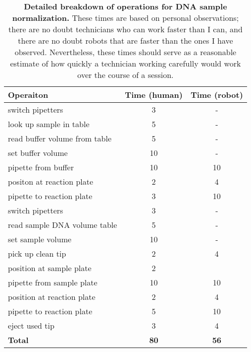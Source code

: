 \begin{table}[]
\centering
\begin{tabular}{lcc}
\toprule
\textbf{Operaiton} & \textbf{Time (human)} & \textbf{Time (robot)} \\ \midrule
switch pipetters & 3 & - \\
look up sample in table & 5 & - \\
read buffer volume from table & 5 & - \\
set buffer volume & 10 & - \\
pipette from buffer & 10 & 10 \\
positon at reaction plate & 2 & 4 \\
pipette to reaction plate & 3 & 10 \\
switch pipetters & 3 & - \\
read sample DNA volume table & 5 & - \\
set sample volume & 10 & - \\
pick up clean tip & 2 & 4 \\
position at sample plate & 2 &  \\
pipette from sample plate & 10 & 10 \\
position at reaction plate & 2 & 4 \\
pipette to reaction plate & 5 & 10 \\
eject used tip & 3 & 4 \\ \midrule
\textbf{Total} & \textbf{80} & \textbf{56} \\ \bottomrule
\end{tabular}
\caption{\textbf{Detailed breakdown of operations for DNA sample normalization.} These times are based on personal observations; there are no doubt technicians who can work faster than I can, and there are no doubt robots that are faster than the ones I have observed. Nevertheless, these times should serve as a reasonable estimate of how quickly a technician working carefully would work over the course of a session.}
\label{DP_table1}
\end{table}